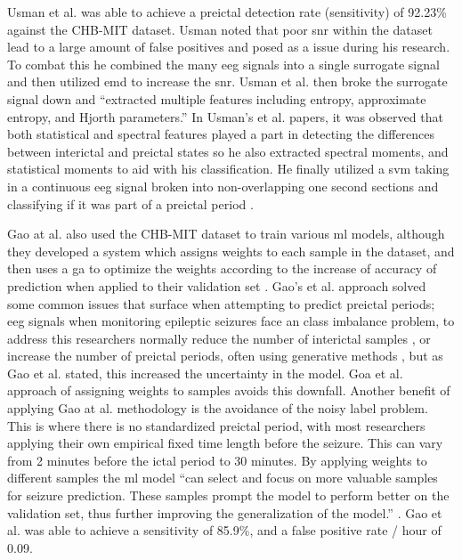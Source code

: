 \documentclass[12pt]{article}
\begin{document}
Usman et al. was able to achieve a preictal detection rate (sensitivity) of 92.23\% against the CHB-MIT dataset. \cite{usman2017epileptic} Usman noted that poor \acrfull{snr} within the dataset lead to a large amount of false positives and posed as a issue during his research. To combat this he combined the many \acrshort{eeg} signals into a single surrogate signal and then utilized \acrfull{emd} to increase the \acrshort{snr}. Usman et al. then broke the surrogate signal down and ``extracted multiple features including entropy, approximate entropy, and Hjorth parameters.'' In Usman's et al. papers, it was observed that both statistical and spectral features played a part in detecting the differences between interictal and preictal states so he also extracted spectral moments, and statistical moments to aid with his classification. He finally utilized a \acrfull{svm} taking in a continuous \acrshort{eeg} signal broken into non-overlapping one second sections and classifying if it was part of a preictal period \cite{usman2017epileptic}.


Gao at al. also used the CHB-MIT dataset to train various \acrshort{ml} models, although they developed a system which assigns weights to each sample in the dataset, and then uses a \acrfull{ga} to optimize the weights according to the increase of accuracy of prediction when applied to their validation set \cite{gao2022general}. Gao's et al. approach solved some common issues that surface when attempting to predict preictal periods; \acrshort{eeg} signals when monitoring epileptic seizures face an class imbalance problem, to address this researchers normally reduce the number of interictal samples \cite{ozcan2019seizure}, or increase the number of preictal periods, often using generative methods \cite{usman2021deep}, but as Gao et al. stated, this increased the uncertainty in the model. Goa et al. approach of assigning weights to samples avoids this downfall. Another benefit of applying Gao at al. methodology is the avoidance of the noisy label problem. This is where there is no standardized preictal period, with most researchers applying their own empirical fixed time length before the seizure. This can vary from 2 minutes before the ictal period to 30 minutes. By applying weights to different samples the \acrshort{ml} model ``can select and focus on more valuable samples for seizure prediction. These samples prompt the model to perform better on the validation set, thus further improving the generalization of the model.'' \cite{gao2022general}. Gao et al. was able to achieve a sensitivity of 85.9\%, and a false positive rate / hour of 0.09. 
\end{document}
